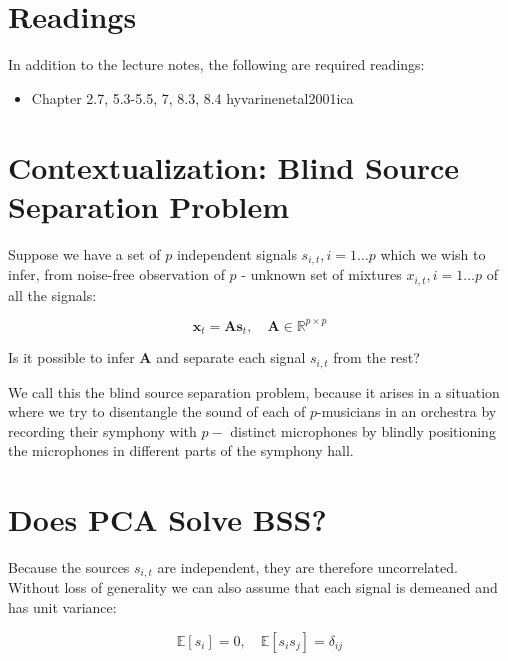 \documentclass[11pt]{article}
\theoremstyle{plain} %
\theoremstyle{remark}
\begin{document}
\begin{center}

  {}
\end{center}
\vspace{2em}

\tableofcontents

\section*{Readings}
In addition to the lecture notes, the following are required readings:

\begin{itemize}
  \item Chapter 2.7, 5.3-5.5, 7, 8.3, 8.4 hyvarinenetal2001ica
\end{itemize}

\section{Contextualization: Blind Source Separation Problem}
Suppose we have a set of $p$ independent signals $s_{i, t}, i=1 \ldots p$ which
we wish to infer, from noise-free observation of $p$ - unknown set of mixtures
$x_{i, t}, i=1 \ldots p$ of all the signals:

$$
\mathbf{x}_{t}=\mathbf{A} \mathbf{s}_{t}, \quad \mathbf{A} \in \mathbb{R}^{p \times p}
$$

Is it possible to infer $\mathbf{A}$ and separate each signal $s_{i, t}$ from
the rest?

We call this the blind source separation problem, because it arises in a
situation where we try to disentangle the sound of each of $p$-musicians in an
orchestra by recording their symphony with $p-$ distinct microphones by blindly
positioning the microphones in different parts of the symphony hall.

\section*{Does PCA Solve BSS?}
Because the sources $s_{i, t}$ are independent, they are therefore uncorrelated.
Without loss of generality we can also assume that each signal is demeaned and
has unit variance:

$$
\mathbb{E}\left[s_{i}\right]=0, \quad \mathbb{E}\left[s_{i} s_{j}\right]=\delta_{i j}
$$
\end{document}

